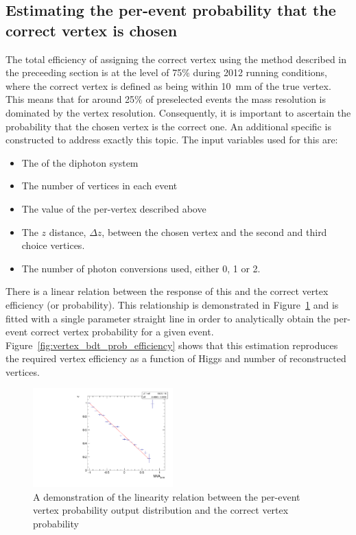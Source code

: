 \subsection{Estimating the per-event probability that the correct vertex is chosen}
\label{sec:bdt_prob}

The total efficiency of assigning the correct vertex using the method described in the preceeding section is at the level of 75\% during 2012 running conditions, where the correct vertex is defined as being within 10~mm of the true vertex. This means that for around 25\% of preselected events the mass resolution is dominated by the vertex resolution. Consequently, it is important to ascertain the probability that the chosen vertex is the correct one. An additional specific \BDT is constructed to address exactly this topic. The input variables used for this \BDT are:

\begin{itemize}
  \item The \pT of the diphoton system
  \item The number of vertices in each event
  \item The value of the per-vertex \BDT described above
  \item The $z$ distance, $\Delta z$, between the chosen vertex and the second and third choice vertices.
  \item The number of photon conversions used, either 0, 1 or 2.
\end{itemize}

There is a linear relation between the response of this \BDT and the correct vertex efficiency (or probability). This relationship is demonstrated in Figure~\ref{fig:vertex_bdt_prob} and is fitted with a single parameter straight line in order to analytically obtain the per-event correct vertex probability for a given event. Figure~\ref{fig:vertex_bdt_prob_efficiency} shows that this estimation reproduces the required vertex efficiency as a function of Higgs \pT and number of reconstructed vertices.

\begin{figure}
  \includegraphics[width=0.48\textwidth]{analysis_comps/plots/vertex_bdt_prob.pdf}
  \caption{A demonstration of the linearity relation between the per-event vertex probability \BDT output distribution and the correct vertex probability}
  \label{fig:vertex_bdt_prob}
\end{figure}

